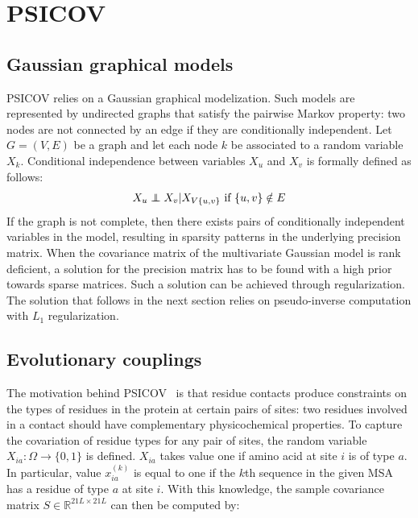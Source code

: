 \section{PSICOV}

    \subsection{Gaussian graphical models}

        PSICOV relies on a Gaussian graphical modelization. Such models are represented by undirected graphs that
        satisfy the pairwise Markov property: two nodes are not connected by an edge if they are conditionally independent.
        Let $G = (V, E)$ be a graph and let each node $k$ be associated to a random variable $X_k$.
        Conditional independence between variables $X_u$ and $X_v$ is formally defined as follows:
        \begin{equation}
            X_u \independent X_v \vert X_{V \\ \{u, v\}} \, \, \text{if } \{u, v\} \notin E  %
        \end{equation}
        If the graph is not complete, then there exists pairs of conditionally independent variables in the model,
        resulting in sparsity patterns in the underlying precision matrix.
        When the covariance matrix of the multivariate Gaussian model is rank deficient, a solution for the precision
        matrix has to be found with a high prior towards sparse matrices. Such a solution can be achieved through
        regularization. The solution that follows in the next section relies on pseudo-inverse computation
        with $L_1$ regularization.

    \subsection{Evolutionary couplings} \label{graphicalmodels}

        The motivation behind PSICOV~\cite{doi:10.1093/bioinformatics/btr638} is that residue contacts produce constraints on the types of residues in the
        protein at certain pairs of sites: two residues involved in a contact should have complementary physicochemical properties. To capture the covariation
        of residue types for any pair of sites, the random variable $X_{ia}: \Omega \rightarrow \{0, 1\}$ is defined. $X_{ia}$ takes value one if  %
        amino acid at site $i$ is of type $a$. In particular, value $x_{ia}^{(k)}$ is equal to one if the $k$th sequence in the given MSA has a residue of type $a$
        at site $i$. With this knowledge, the sample covariance matrix $S \in \mathbb{R}^{21 L \times 21 L}$ can then be computed by:

